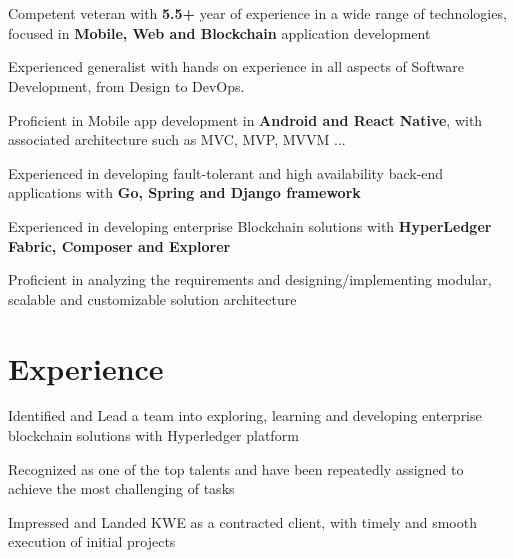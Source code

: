 \documentclass[]{deedy-resume-openfont}
\begin{document}


\section{}
\raggedright
{}
\begin{tightemize}
	\item Competent veteran with \textbf{5.5+} year of experience in a wide range of technologies, focused in \textbf{Mobile, Web and Blockchain} application development
	\item Experienced generalist with hands on experience in all aspects of Software Development, from Design to DevOps. 
	\item Proficient in Mobile app development in \textbf{Android and React Native}, with associated architecture such as MVC, MVP, MVVM ...
	\item Experienced in developing fault-tolerant and high availability back-end applications with \textbf{Go, Spring and Django framework}
	\item Experienced in developing enterprise Blockchain solutions with \textbf{HyperLedger Fabric, Composer and Explorer}
	\item Proficient in analyzing the requirements and designing/implementing modular, scalable and customizable solution architecture
\end{tightemize}
\sectionsep


\section{Experience}
\hfill {}
\begin{tightemize}
	\item Identified and Lead a team into exploring, learning and developing enterprise blockchain solutions with Hyperledger platform
    \item Recognized as one of the top talents and have been repeatedly assigned to achieve the most challenging of tasks 
	\item Impressed and Landed KWE as a contracted client, with timely and smooth execution of initial projects
\end{tightemize}
\sectionsep
\end{document}
